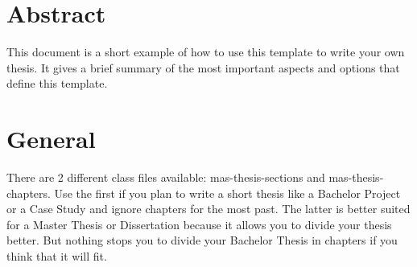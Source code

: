 \documentclass[masterthesis, english]{mas-thesis-chapters} %
\begin{document}


%
%
\makelicensepageCCBYSA


\cleardoublepage
{}
%
\tableofcontents		%
\newpage
\listofillustrations	%


\cleardoublepage

\newpage
\begingroup %
	\let\clearpage\relax
	\printglossaries
\endgroup



\chapter*{Abstract}
{}%

This document is a short example of how to use this template to write your own thesis. It gives a brief summary of the most important aspects and options that define this template.


\cleardoublepage
{}
\setcounter{page}{1}


\chapter{General}

There are 2 different class files available: mas-thesis-sections and mas-thesis-chapters. Use the first if you plan to write a short thesis like a Bachelor Project or a Case Study and ignore chapters for the most past. The latter is better suited for a Master Thesis or Dissertation because it allows you to divide your thesis better. But nothing stops you to divide your Bachelor Thesis in chapters if you think that it will fit.
\end{document}
